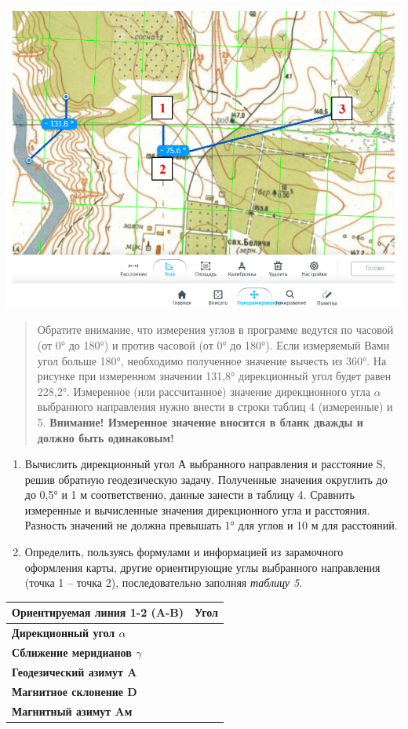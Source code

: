 \documentclass[
  12pt,
]{book}
\begin{document}
\includegraphics{images/Coordinates/Angles.png}

\begin{quote}
Обратите внимание, что измерения углов в программе ведутся по часовой (от 0° до 180°) и против часовой (от 0° до 180°). Если измеряемый Вами угол больше 180°, необходимо полученное значение вычесть из 360°. На рисунке при измеренном значении 131,8° дирекционный угол будет равен 228,2°. Измеренное (или рассчитанное) значение дирекционного угла \(\alpha\) выбранного направления нужно внести в строки таблиц 4 (измеренные) и 5.
\textbf{Внимание! Измеренное значение вносится в бланк дважды и должно быть одинаковым!}
\end{quote}

\begin{enumerate}
\def\labelenumi{\arabic{enumi}.}
\setcounter{enumi}{6}
\item
  Вычислить дирекционный угол А выбранного направления и расстояние S, решив обратную геодезическую задачу. Полученные значения округлить до до 0,5° и 1 м соответственно, данные занести в таблицу 4. Сравнить измеренные и вычисленные значения дирекционного угла и расстояния. Разность значений не должна превышать 1° для углов и 10 м для расстояний.
\item
  Определить, пользуясь формулами и информацией из зарамочного оформления карты, другие ориентирующие углы выбранного направления (точка 1 -- точка 2), последовательно заполняя \emph{таблицу 5}.
\end{enumerate}

\begin{longtable}[]{@{}ll@{}}
\toprule\noalign{}
Ориентируемая линия 1-2 (A-B) & Угол \\
\midrule\noalign{}
\endhead
\bottomrule\noalign{}
\endlastfoot
\textbf{Дирекционный угол \(\alpha\)} & \\
\textbf{Сближение меридианов \(\gamma\)} & \\
\textbf{Геодезический азимут A} & \\
\textbf{Магнитное склонение D} & \\
\textbf{Магнитный азимут Aм} & \\
\end{longtable}
\end{document}
